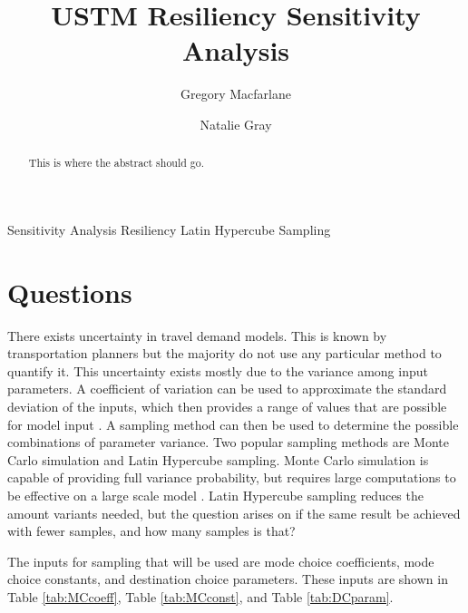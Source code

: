 \documentclass[3p, authoryear, review]{elsarticle} %
\begin{document}
\begin{frontmatter}

  \title{USTM Resiliency Sensitivity Analysis}
    \author[Brigham Young University]{Gregory Macfarlane}
    \author[Brigham Young University]{Natalie Gray}
      \address[Brigham Young University]{Civil and Environmental Engineering Department, 430 Engineering Building, Provo, Utah 84602}
  
  \begin{abstract}
  This is where the abstract should go.
  \end{abstract}
   \begin{keyword} Sensitivity Analysis Resiliency Latin Hypercube Sampling\end{keyword}
 \end{frontmatter}

\hypertarget{questions}{%
\section{Questions}\label{questions}}

There exists uncertainty in travel demand models. This is known by transportation planners but the majority do not use any particular method to quantify it. This uncertainty exists mostly due to the variance among input parameters. A coefficient of variation can be used to approximate the standard deviation of the inputs, which then provides a range of values that are possible for model input \citep{zhao2002propagation}. A sampling method can then be used to determine the possible combinations of parameter variance. Two popular sampling methods are Monte Carlo simulation and Latin Hypercube sampling. Monte Carlo simulation is capable of providing full variance probability, but requires large computations to be effective on a large scale model \citep{yang2013sensitivity}. Latin Hypercube sampling reduces the amount variants needed, but the question arises on if the same result be achieved with fewer samples, and how many samples is that?

The inputs for sampling that will be used are mode choice coefficients, mode choice constants, and destination choice parameters. These inputs are shown in Table \ref{tab:MCcoeff}, Table \ref{tab:MCconst}, and Table \ref{tab:DCparam}.
\end{document}
